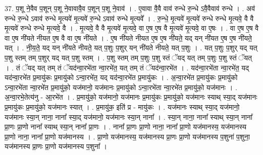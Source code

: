 \documentclass[17pt]{extarticle}
\begin{document}
37. प॒शू ने॒वैव प॒शून् प॒शू ने॒वावावै॒व प॒शून् प॒शू ने॒वाव॑ । . ए॒वावा वै॒वै वाव॑ रुन्धे रु॒न्धे ऽवै॒वैवाव॑ रुन्धे । . अव॑ रुन्धे रु॒न्धे ऽवाव॑ रुन्धे मृ॒त्यवे॑ मृ॒त्यवे॑ रु॒न्धे ऽवाव॑ रुन्धे मृ॒त्यवे᳚ । . रु॒न्धे॒ मृ॒त्यवे॑ मृ॒त्यवे॑ रुन्धे रुन्धे मृ॒त्यवे॒ वै वै मृ॒त्यवे॑ रुन्धे रुन्धे मृ॒त्यवे॒ वै । . मृ॒त्यवे॒ वै वै मृ॒त्यवे॑ मृ॒त्यवे॒ वा ए॒ष ए॒ष वै मृ॒त्यवे॑ मृ॒त्यवे॒ वा ए॒षः । . वा ए॒ष ए॒ष वै वा ए॒ष नी॑यते नीयत ए॒ष वै वा ए॒ष नी॑यते । . ए॒ष नी॑यते नीयत ए॒ष ए॒ष नी॑यते॒ यद् यन् नी॑यत ए॒ष ए॒ष नी॑यते॒ यत् । . नी॒य॒ते॒ यद् यन् नी॑यते नीयते॒ यत् प॒शुः प॒शुर् यन् नी॑यते नीयते॒ यत् प॒शुः । . यत् प॒शुः प॒शुर् यद् यत् प॒शु स्तम् तम् प॒शुर् यद् यत् प॒शु स्तम् । . प॒शु स्तम् तम् प॒शुः प॒शु स्तं ॅयद् यत् तम् प॒शुः प॒शु स्तं ॅयत् । . तं ॅयद् यत् तम् तं ॅयद॑न्वा॒रभे॑ता न्वा॒रभे॑त॒ यत् तम् तं ॅयद॑न्वा॒रभे॑त । . यद॑न्वा॒रभे॑ता न्वा॒रभे॑त॒ यद् यद॑न्वा॒रभे॑त प्र॒मायु॑कः प्र॒मायु॑को ऽन्वा॒रभे॑त॒ यद् यद॑न्वा॒रभे॑त प्र॒मायु॑कः । . अ॒न्वा॒रभे॑त प्र॒मायु॑कः प्र॒मायु॑को ऽन्वा॒रभे॑ता न्वा॒रभे॑त प्र॒मायु॑को॒ यज॑मानो॒ यज॑मानः प्र॒मायु॑को ऽन्वा॒रभे॑ता न्वा॒रभे॑त प्र॒मायु॑को॒ यज॑मानः । . अ॒न्वा॒रभे॒तेत्य॑नु - आ॒रभे॑त । . प्र॒मायु॑को॒ यज॑मानो॒ यज॑मानः प्र॒मायु॑कः प्र॒मायु॑को॒ यज॑मानः स्याथ् स्या॒द् यज॑मानः प्र॒मायु॑कः प्र॒मायु॑को॒ यज॑मानः स्यात् । . प्र॒मायु॑क॒ इति॑ प्र - मायु॑कः । . यज॑मानः स्याथ् स्या॒द् यज॑मानो॒ यज॑मानः स्या॒न् नाना॒ नाना᳚ स्या॒द् यज॑मानो॒ यज॑मानः स्या॒न् नाना᳚ । . स्या॒न् नाना॒ नाना᳚ स्याथ् स्या॒न् नाना᳚ प्रा॒णः प्रा॒णो नाना᳚ स्याथ् स्या॒न् नाना᳚ प्रा॒णः । . नाना᳚ प्रा॒णः प्रा॒णो नाना॒ नाना᳚ प्रा॒णो यज॑मानस्य॒ यज॑मानस्य प्रा॒णो नाना॒ नाना᳚ प्रा॒णो यज॑मानस्य । . प्रा॒णो यज॑मानस्य॒ यज॑मानस्य प्रा॒णः प्रा॒णो यज॑मानस्य प॒शुना॑ प॒शुना॒ यज॑मानस्य प्रा॒णः प्रा॒णो यज॑मानस्य प॒शुना᳚ । \newline
\end{document}
